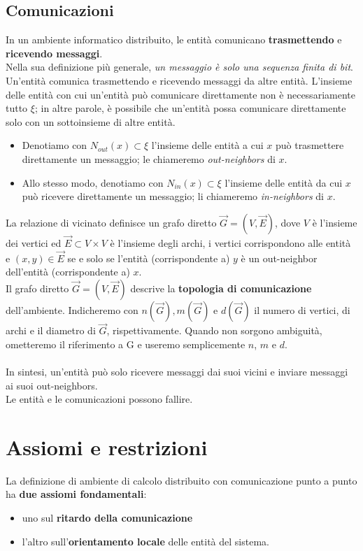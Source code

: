 \subsection*{Comunicazioni}
In un ambiente informatico distribuito, le entità comunicano \textbf{trasmettendo} e \textbf{ricevendo messaggi}.\\
Nella sua definizione più generale, \textit{un messaggio è solo una sequenza finita di bit}.\\
Un'entità comunica trasmettendo e ricevendo messaggi da altre entità. L'insieme delle entità con cui un'entità può comunicare direttamente non è necessariamente tutto $\xi$; in altre parole, è possibile che un'entità possa comunicare direttamente solo con un sottoinsieme di altre entità.
\begin{itemize}
    \item Denotiamo con $N_{out}(x) \subset \xi$ l'insieme delle entità a cui $x$ può trasmettere direttamente un messaggio; le chiameremo \textit{out-neighbors} di $x$. 
    \item  Allo stesso modo, denotiamo con $N_{in}(x) \subset \xi$ l'insieme delle entità da cui $x$ può ricevere direttamente un messaggio; li chiameremo \textit{in-neighbors} di $x$.
\end{itemize}
 
La relazione di vicinato definisce un grafo diretto $\overrightarrow{G} = (V , \overrightarrow{E})$, dove $V$ è l'insieme dei vertici ed $\overrightarrow{E} \subset V \times V$ è l'insieme degli archi, i vertici corrispondono alle entità e $(x, y) \in \overrightarrow{E}$ se e solo se l'entità (corrispondente a) $y$ è un out-neighbor dell'entità (corrispondente a) $x$.\\
Il grafo diretto $\overrightarrow{G} = (V , \overrightarrow{E})$ descrive la \textbf{topologia di comunicazione} dell'ambiente. Indicheremo con $n(\overrightarrow{G}), m(\overrightarrow{G})$ e $d(\overrightarrow{G})$ il numero di vertici, di archi e il diametro di $\overrightarrow{G}$, rispettivamente. Quando non sorgono ambiguità, ometteremo il riferimento a G e useremo semplicemente $n$, $m$ e $d$.\\\\
In sintesi, un'entità può solo ricevere messaggi dai suoi vicini e inviare messaggi ai suoi out-neighbors.\\
Le entità e le comunicazioni possono fallire.

\section{Assiomi e restrizioni}
La definizione di ambiente di calcolo distribuito con comunicazione punto a punto ha \textbf{due assiomi fondamentali}:
\begin{itemize}
    \item uno sul \textbf{ritardo della comunicazione}
    \item  l'altro sull'\textbf{orientamento locale} delle entità del sistema.
\end{itemize}


